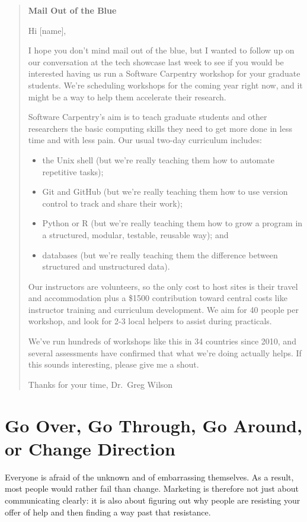 \documentclass[10pt,statementpaper]{memoir}
\begin{document}
\begin{quote}
\textbf{Mail Out of the Blue}

Hi {[}name{]},

I hope you don't mind mail out of the blue, but I wanted to follow up on
our conversation at the tech showcase last week to see if you would be
interested having us run a Software Carpentry workshop for your graduate
students. We're scheduling workshops for the coming year right now, and
it might be a way to help them accelerate their research.

Software Carpentry's aim is to teach graduate students and other
researchers the basic computing skills they need to get more done in
less time and with less pain. Our usual two-day curriculum includes:

\begin{itemize}
\item
  the Unix shell (but we're really teaching them how to automate
  repetitive tasks);
\item
  Git and GitHub (but we're really teaching them how to use version
  control to track and share their work);
\item
  Python or R (but we're really teaching them how to grow a program in a
  structured, modular, testable, reusable way); and
\item
  databases (but we're really teaching them the difference between
  structured and unstructured data).
\end{itemize}

Our instructors are volunteers, so the only cost to host sites is their
travel and accommodation plus a \$1500 contribution toward central costs
like instructor training and curriculum development. We aim for 40
people per workshop, and look for 2-3 local helpers to assist during
practicals.

We've run hundreds of workshops like this in 34 countries since 2010,
and several assessments have confirmed that what we're doing actually
helps. If this sounds interesting, please give me a shout.

Thanks for your time, Dr.~Greg Wilson
\end{quote}

\section{Go Over, Go Through, Go Around, or Change
Direction}\label{go-over-go-through-go-around-or-change-direction}

Everyone is afraid of the unknown and of embarrassing themselves. As a
result, most people would rather fail than change. Marketing is
therefore not just about communicating clearly: it is also about
figuring out why people are resisting your offer of help and then
finding a way past that resistance.
\end{document}
